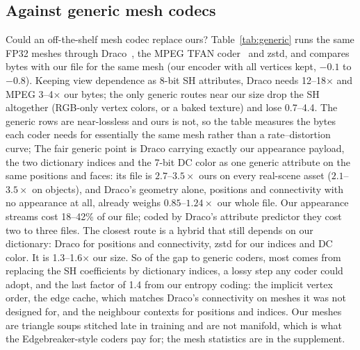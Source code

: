 \subsection{Against generic mesh codecs}
\label{sec:e5}
Could an off-the-shelf mesh codec replace ours? Table~\ref{tab:generic} runs the same FP32 meshes through Draco~\cite{draco}, the MPEG TFAN coder~\cite{mamou2009tfan} and zstd, and compares bytes with our file for the same mesh (our encoder with all vertices kept, $-0.1$ to $-0.8$\dB). Keeping view dependence as 8-bit SH attributes, Draco needs 12--18$\times$ and MPEG 3--4$\times$ our bytes; the only generic routes near our size drop the SH altogether (RGB-only vertex colors, or a baked texture) and lose 0.7--4.4\dB. The generic rows are near-lossless and ours is not, so the table measures the bytes each coder needs for essentially the same mesh rather than a rate--distortion curve; The fair generic point is Draco carrying exactly our appearance payload, the two dictionary indices and the 7-bit DC color as one generic attribute on the same positions and faces: its file is $2.7$--$3.5\times$ ours on every real-scene asset ($2.1$--$3.5\times$ on objects), and Draco's geometry alone, positions and connectivity with no appearance at all, already weighs $0.85$--$1.24\times$ our whole file. Our appearance streams cost 18--42\% of our file; coded by Draco's attribute predictor they cost two to three files. The closest route is a hybrid that still depends on our dictionary: Draco for positions and connectivity, zstd for our indices and DC color. It is 1.3--1.6$\times$ our size. So of the gap to generic coders, most comes from replacing the SH coefficients by dictionary indices, a lossy step any coder could adopt, and the last factor of 1.4 from our entropy coding: the implicit vertex order, the edge cache, which matches Draco's connectivity on meshes it was not designed for, and the neighbour contexts for positions and indices. Our meshes are triangle soups stitched late in training and are not manifold, which is what the Edgebreaker-style coders pay for; the mesh statistics are in the supplement.

